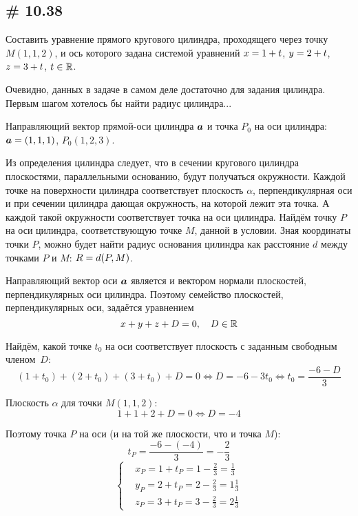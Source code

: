 \documentclass[a4paper,12pt]{article}
\begin{document}
  
  \subsection{\# 10.38}
  
  Составить уравнение прямого кругового цилиндра, проходящего через точку $M(1, 1, 2)$, и ось которого задана системой уравнений $x \hm= 1 \hm+ t$, $y \hm= 2 \hm+ t$, $z \hm= 3 \hm+ t$, $t \hm\in \RR$.
  
  \begin{solution}
    
    Очевидно, данных в задаче в самом деле достаточно для задания цилиндра.
    Первым шагом хотелось бы найти радиус цилиндра...
    
    Направляющий вектор прямой-оси цилиндра $\boldsymbol a$ и точка $P_0$ на оси цилиндра: $\bds a \hm= (1, 1, 1)$, $P_0(1, 2, 3)$.
    
    Из определения цилиндра следует, что в сечении кругового цилиндра плоскостями, параллельными основанию, будут получаться окружности.
    Каждой точке на поверхности цилиндра соответствует плоскость $\alpha$, перпендикулярная оси и при сечении цилиндра дающая окружность, на которой лежит эта точка.
    А каждой такой окружности соответствует точка на оси цилиндра.
    Найдём точку $P$ на оси цилиндра, соответствующую точке $M$, данной в условии.
    Зная координаты точки $P$, можно будет найти радиус основания цилиндра как расстояние $d$ между точками $P$ и $M$: $R \hm= d(P, M)$.
    
    Направляющий вектор оси $\boldsymbol a$ является и вектором нормали плоскостей, перпендикулярных оси цилиндра.
    Поэтому семейство плоскостей, перпендикулярных оси, задаётся уравнением
    \begin{equation}
      \label{eq:family-of-planes}
      x + y + z + D = 0,\quad D \in \operatorname{\mathbb R}
    \end{equation}
    
    Найдём, какой точке $t_0$ на оси соответствует плоскость с заданным свободным членом~$D$:
    \[
      (1 + t_0) + (2 + t_0) + (3 + t_0) + D = 0 \Leftrightarrow D = -6 - 3t_0 \Leftrightarrow t_0 = \frac{-6 - D}{3}
    \]
    
    Плоскость $\alpha$ для точки $M(1, 1, 2)$:
    \[
      1 + 1 + 2 + D = 0 \Leftrightarrow D = -4
    \]
    
    Поэтому точка $P$ на оси (и на той же плоскости, что и точка $M$):
    \[
      t_P = \frac{-6 - (-4)}{3} = -\frac{2}{3}
    \]
    \[
      \left\{
        \begin{aligned}
          &x_P = 1 + t_P = 1 - \frac{2}{3} = \frac{1}{3}\\
          &y_P = 2 + t_P = 2 - \frac{2}{3} = 1\frac{1}{3}\\
          &z_P = 3 + t_P = 3 - \frac{2}{3} = 2\frac{1}{3}
        \end{aligned}
      \right.
    \]
    

\end{solution}
\end{document}

